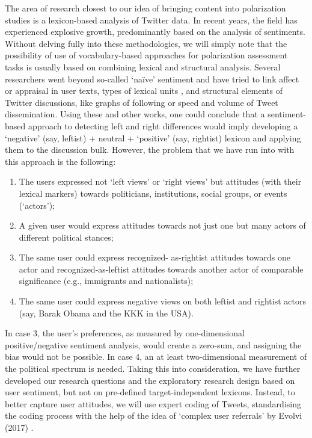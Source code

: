 The area of research closest to our idea of bringing content into polarization studies is a lexicon-based analysis of Twitter data. In recent years, the field has experienced explosive growth, predominantly based on the analysis of sentiments. Without delving fully into these methodologies, we will simply note that the possibility of use of vocabulary-based approaches for polarization assessment tasks \cite{HillmanTrier} is usually based on combining lexical and structural analysis. Several researchers went beyond so-called ‘naïve’ sentiment and have tried to link affect \cite{StieglitzDangXuan} or appraisal \cite{DangXuanStieglitzWladarsch} in user texts, types of lexical units \cite{SperiosuSudanUpadhyay}, and structural elements of Twitter discussions, like graphs of following or speed and volume of Tweet dissemination. Using these and other works, one could conclude that a sentiment-based approach to detecting left and right differences would imply developing a ‘negative’ (say, leftist) + neutral + ‘positive’ (say, rightist) lexicon and applying them to the discussion bulk. However, the problem that we have run into with this approach is the following:

\begin{enumerate}
	\item The users expressed not ‘left views’ or ‘right views’ but attitudes (with their lexical markers) towards politicians, institutions, social groups, or events (‘actors’);
	\item A given user would express attitudes towards not just one but many actors of different political stances;
	\item The same user could express recognized- as-rightist attitudes towards one actor and recognized-as-leftist attitudes towards another actor of comparable significance (e.g., immigrants and nationalists);
	\item The same user could express negative views on both leftist and rightist actors (say, Barak Obama and the KKK in the USA).
\end{enumerate}

In case 3, the user’s preferences, as measured by one-dimensional positive/negative sentiment analysis, would create a zero-sum, and assigning the bias would not be possible. In case 4, an at least two-dimensional measurement of the political spectrum is needed. Taking this into consideration, we have further developed our research questions and the exploratory research design based on user sentiment, but not on pre-defined target-independent lexicons. Instead, to better capture user attitudes, we will use expert coding of Tweets, standardising the coding process with the help of the idea of ‘complex user referrals’ by Evolvi (2017) \cite{Evolvi}.


